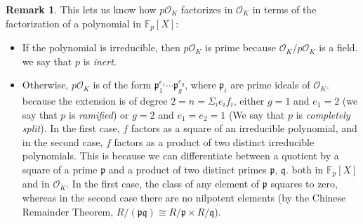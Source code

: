 \documentclass[11pt]{article}
\theoremstyle{definition}
\newtheorem{rk}[theorem]{Remark}
\begin{document}
    \begin{rk}
        This lets us know how $p\mathcal{O}_K$ factorizes in $\mathcal{O}_K$
        in terms of the factorization of a polynomial in $\mathbb{F}_p[X]$:
        \begin{itemize}
            \item If the polynomial is irreducible, then $p\mathcal{O}_K$ is prime because $\mathcal{O}_K / p \mathcal{O}_K$ is a field.
                we say that $p$ is \emph{inert}.
            \item Otherwise, $p\mathcal{O}_K$ is of the form $\mathfrak{p}_1^{e_1} \cdots \mathfrak{p}_g^{e_g}$,
                where $\mathfrak{p}_i$ are prime ideals of $\mathcal{O}_K$.
                because the extension is of degree $2 = n = \varSigma_i e_i f_i$,
                either $g=1$ and $e_1 = 2$ (we say that $p$ is \emph{ramified}) or $g=2$ and $e_1 = e_2 = 1$ (We say that $p$ is \emph{completely split}).
                In the first case, $f$ factors as a square of an irreducible polynomial,
                and in the second case, $f$ factors as a product of two distinct irreducible polynomials.
                This is because we can differentiate between a quotient by a square of a prime $\mathfrak{p}$ and a product of two distinct primes $\mathfrak{p}$, $\mathfrak{q}$.
                both in $\mathbb{F}_p[X]$ and in $\mathcal{O}_K$.
                In the first case, the class of any element of $\mathfrak{p}$ squares to zero,
                whereas in the second case there are no nilpotent elements (by the Chinese Remainder Theorem,
                $R/(\mathfrak{p}\mathfrak{q}) \cong R/\mathfrak{p} \times R/\mathfrak{q}$).
        \end{itemize}
    \end{rk}
    
\end{document}
